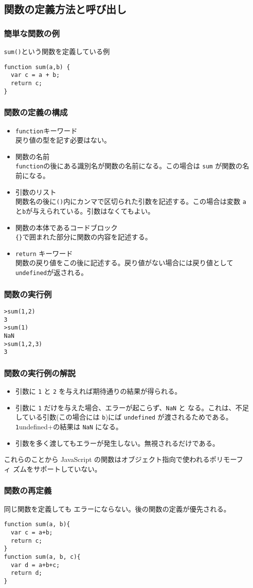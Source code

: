 \subsection{関数の定義方法と呼び出し}
\begin{frame}[containsverbatim]
\frametitle{簡単な関数の例}
\Verb+sum()+という関数を定義している例
\begin{Verbatim}
function sum(a,b) {
  var c = a + b;
  return c;
}
\end{Verbatim}
\end{frame}
\begin{frame}[containsverbatim]
\frametitle{関数の定義の構成}
\begin{itemize}
 \item \Verb+function+キーワード\\
戻り値の型を記す必要はない。
 \item 関数の名前\\
\Verb+function+の後にある識別名が関数の名前になる。この場合は \Verb+sum+
       が関数の名前になる。
 \item 引数のリスト\\
関数名の後に\Verb+()+内にカンマで区切られた引数を記述する。この場合は変数
       \Verb+a+と\Verb+b+が与えられている。引数はなくてもよい。
 \item 関数の本体であるコードブロック\\
\Verb+{}+で囲まれた部分に関数の内容を記述する。
\item \Verb+return+ キーワード\\
関数の戻り値をこの後に記述する。戻り値がない場合には戻り値として
       \Verb+undefined+が返される。
\end{itemize}
\end{frame}
\begin{frame}[containsverbatim]
\frametitle{関数の実行例}
\begin{Verbatim}
>sum(1,2)
3
>sum(1)
NaN
>sum(1,2,3)
3
\end{Verbatim} 
\end{frame}
\begin{frame}[containsverbatim]
\frametitle{関数の実行例の解説}
\begin{itemize}
 \item 引数に \Verb+1+ と \Verb+2+ を与えれば期待通りの結果が得られる。
 \item 引数に \Verb+1+ だけを与えた場合、エラーが起こらず、\Verb+NaN+ と
       なる。これは、不足している引数(この場合には \Verb+b+)にば
       \Verb+undefined+ が渡されるためである。\Verb+1+undefined+の結果は
       \Verb+NaN+ になる。
 \item 引数を多く渡してもエラーが発生しない。無視されるだけである。
\end{itemize}
これらのことから JavaScript の関数はオブジェクト指向で使われるポリモーフィ
ズムをサポートしていない。
\end{frame}
\begin{frame}[containsverbatim]
\frametitle{関数の再定義}
同じ関数を定義しても
エラーにならない。後の関数の定義が優先される。
\begin{Verbatim}
function sum(a, b){
  var c = a+b;
  return c;
}
function sum(a, b, c){
  var d = a+b+c;
  return d;
}
\end{Verbatim}
\end{frame}
